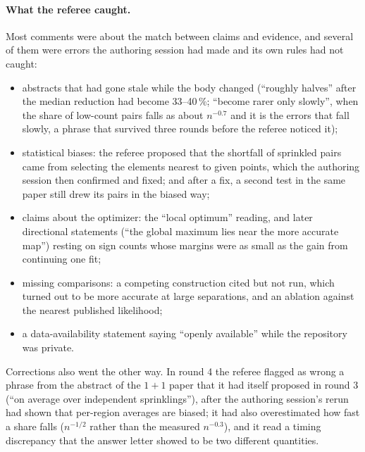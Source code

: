 \documentclass[11pt,a4paper]{article}
\begin{document}
\paragraph{What the referee caught.} Most comments were about the match between claims and evidence, and several of them were errors the authoring session had made and its own rules had not caught:
\begin{itemize}[itemsep=1pt]
\item abstracts that had gone stale while the body changed (``roughly halves'' after the median reduction had become 33--40\,\%; ``become rarer only slowly'', when the share of low-count pairs falls as about $n^{-0.7}$ and it is the errors that fall slowly, a phrase that survived three rounds before the referee noticed it);
\item statistical biases: the referee proposed that the shortfall of sprinkled pairs came from selecting the elements nearest to given points, which the authoring session then confirmed and fixed; and after a fix, a second test in the same paper still drew its pairs in the biased way;
\item claims about the optimizer: the ``local optimum'' reading, and later directional statements (``the global maximum lies near the more accurate map'') resting on sign counts whose margins were as small as the gain from continuing one fit;
\item missing comparisons: a competing construction cited but not run, which turned out to be more accurate at large separations, and an ablation against the nearest published likelihood;
\item a data-availability statement saying ``openly available'' while the repository was private.
\end{itemize}
Corrections also went the other way. In round 4 the referee flagged as wrong a phrase from the abstract of the $1+1$ paper that it had itself proposed in round 3 (``on average over independent sprinklings''), after the authoring session's rerun had shown that per-region averages are biased; it had also overestimated how fast a share falls ($n^{-1/2}$ rather than the measured $n^{-0.3}$), and it read a timing discrepancy that the answer letter showed to be two different quantities.
\end{document}
